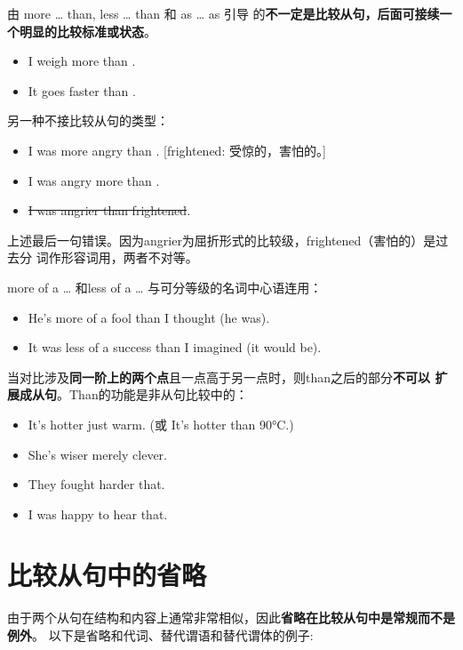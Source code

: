 由 more \ldots{} than, less \ldots{} than 和 as \ldots{} as 引导
的\textbf{不一定是比较从句，后面可接续一个明显的比较标准或状态}。
\begin{itemize}
\item I weigh more than .

\item It goes faster than .

\end{itemize}

另一种不接比较从句的类型：
\begin{itemize}
\item I was more angry than . [frightened:
   受惊的，害怕的。]
\item I was angry more than .

\item \sout{I was angrier than frightened}.
\end{itemize}
上述最后一句错误。因为angrier为屈折形式的比较级，frightened（害怕的）是过去分
词作形容词用，两者不对等。

more of a \ldots{} 和less of a \ldots{} 与可分等级的名词中心语连用：
\begin{itemize}
\item He's more of a fool than I thought (he was).

\item It was less of a success than I imagined (it would be).
\end{itemize}

当对比涉及\textbf{同一阶上的两个点}且一点高于另一点时，则than之后的部分\textbf{不可以
扩展成从句}。Than的功能是非从句比较中的：
\begin{itemize}
\item It's hotter  just warm. (或 It's hotter than 90°C.)
\item She's wiser  merely clever.
\item They fought harder  that.
\item I was  happy to hear that.
\end{itemize}

\section{比较从句中的省略}

由于两个从句在结构和内容上通常非常相似，因此\textbf{省略在比较从句中是常规而不是例外}。
以下是省略和代词、替代谓语和替代谓体的例子:

